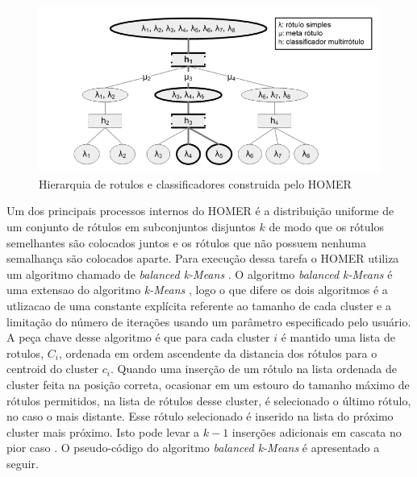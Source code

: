   \begin{figure}[!htb]
    \centering
    \includegraphics[scale=0.5]{figures/HOMERHierarquia}
    \caption{Hierarquia de rotulos e classificadores construida pelo HOMER  \cite{tsoumakas2008effective}}
    \label{fig:hierarquia_homer}
  \end{figure}

Um dos principais processos internos do HOMER é a distribuição uniforme de um conjunto de rótulos em subconjuntos disjuntos $k$ de modo que os rótulos semelhantes são colocados juntos e os rótulos que não possuem nenhuma semalhança são colocados aparte. Para execução dessa tarefa o HOMER utiliza um algoritmo chamado de \textit{balanced k-Means} \cite{tsoumakas2008effective}. O algoritmo \textit{balanced k-Means} é uma extensao do algoritmo \textit{k-Means} \cite{macqueen1967some}, logo o que difere os dois algoritmos é a utlizacao de uma constante explícita referente ao tamanho de cada cluster e a limitação do número de iterações usando um parâmetro especificado pelo usuário. A peça chave desse algoritmo é que para cada cluster $i$ é mantido uma lista de rotulos, $C_i$, ordenada em ordem ascendente da distancia dos rótulos para o centroid do cluster $c_i$. Quando uma inserção de um rótulo na lista ordenada de cluster feita na posição correta, ocasionar em um estouro do tamanho máximo de rótulos permitidos, na lista de rótulos desse cluster, é selecionado o último rótulo, no caso o mais distante. Esse rótulo selecionado é inserido na lista do próximo cluster mais próximo.  Isto pode levar a $k - 1$  inserções adicionais em cascata no pior caso \cite{tsoumakas2008effective}. O pseudo-código do algoritmo \textit{balanced k-Means} é apresentado a seguir.\\



